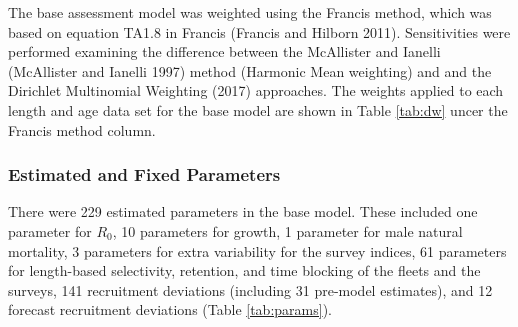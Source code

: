 \documentclass[11pt,
  english,
  a4paper,
]{article}
\begin{document}
\leavevmode\tagmcend\tagstructend\par


The base assessment model was weighted using the Francis method, which was based on equation TA1.8 in Francis {(Francis and Hilborn 2011)\leavevmode\tagmcend\tagstructend}. Sensitivities were performed examining the difference between the McAllister and Ianelli {(McAllister and Ianelli 1997)\leavevmode\tagmcend\tagstructend} method (Harmonic Mean weighting) and and the Dirichlet Multinomial Weighting {(2017)\leavevmode\tagmcend\tagstructend} approaches. The weights applied to each length and age data set for the base model are shown in Table \ref{tab:dw} uncer the Francis method column.

\leavevmode\tagmcend\tagstructend\par


\hypertarget{estimated-and-fixed-parameters}{%
\subsubsection{Estimated and Fixed Parameters}\label{estimated-and-fixed-parameters}}

\leavevmode\tagmcend\tagstructend


There were 229 estimated parameters in the base model. These included one parameter for {\(R_0\)\leavevmode\tagmcend\tagstructend}, 10 parameters for growth, 1 parameter for male natural mortality, 3 parameters for extra variability for the survey indices, 61 parameters for length-based selectivity, retention, and time blocking of the fleets and the surveys, 141 recruitment deviations (including 31 pre-model estimates), and 12 forecast recruitment deviations (Table \ref{tab:params}).

\leavevmode\tagmcend\tagstructend\par

\end{document}

